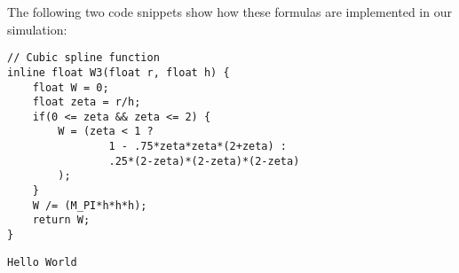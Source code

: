 \documentclass{sigchi}
\begin{document}
%
The following two code snippets show how these formulas are implemented in our simulation:
\begin{lstlisting}[caption=Cubic Spline]
// Cubic spline function
inline float W3(float r, float h) {
	float W = 0;
	float zeta = r/h;
	if(0 <= zeta && zeta <= 2) {
		W = (zeta < 1 ? 
				1 - .75*zeta*zeta*(2+zeta) :
				.25*(2-zeta)*(2-zeta)*(2-zeta)
		);
	}
	W /= (M_PI*h*h*h);
	return W;
}
\end{lstlisting}
%
\begin{lstlisting}[caption=Derivative of Cubic Spline]
Hello World
\end{lstlisting}
\end{document}
